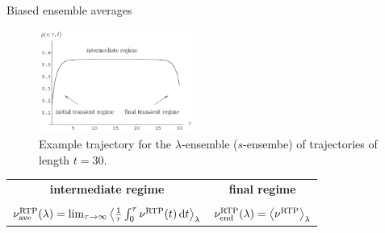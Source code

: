 \documentclass{beamer}
\begin{document}
\begin{frame}{Biased ensemble averages}

\begin{figure}
\centering
\includegraphics[width=0.45\textwidth]{Garrahan_2009_fig7.png}
\caption{Example trajectory for the $\lambda$-ensemble ($s$-ensembe) of trajectories of length $t = 30$. }
\end{figure}

\begin{center}
\begin{tabular}{c@{\hskip 30pt}c}
{\bf intermediate regime} & {\bf final regime}\mbox{}\\\\
$\nu^{\rm RTP}_{\rm ave}(\lambda) = \lim_{\tau \to \infty} \left<\frac{1}{\tau} \int_0^{\tau} \nu^{\rm RTP}(t) \, \mathrm{d}t\right>_{\lambda}$ & $\nu^{\rm RTP}_{\rm end}(\lambda) = \left<\nu^{\rm RTP}\right>_{\lambda}$
\end{tabular}
\end{center}

\end{frame}
\end{document}

